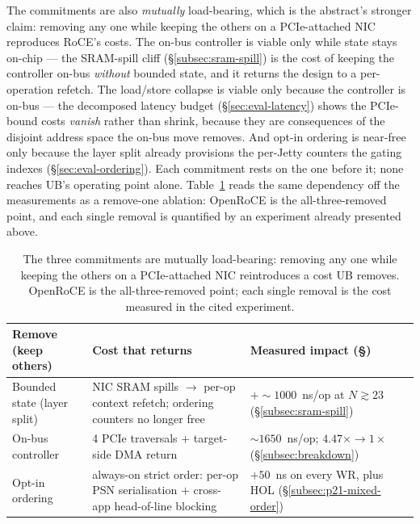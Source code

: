 \documentclass[10pt,twocolumn]{article}
\begin{document}
The commitments are also \emph{mutually} load-bearing, which is the
abstract's stronger claim: removing any one while keeping the others
on a PCIe-attached NIC reproduces RoCE's costs. The on-bus
controller is viable only while state stays on-chip --- the
SRAM-spill cliff (\S\ref{subsec:sram-spill}) is the cost of keeping
the controller on-bus \emph{without} bounded state, and it returns
the design to a per-operation refetch. The load/store collapse is
viable only because the controller is on-bus --- the decomposed
latency budget (\S\ref{sec:eval-latency}) shows the PCIe-bound costs
\emph{vanish} rather than shrink, because they are consequences of
the disjoint address space the on-bus move removes. And opt-in
ordering is near-free only because the layer split already
provisions the per-Jetty counters the gating indexes
(\S\ref{sec:eval-ordering}). Each commitment rests on the one before
it; none reaches UB's operating point alone.
Table~\ref{tab:ablation} reads the same dependency off the
measurements as a remove-one ablation: OpenRoCE is the
all-three-removed point, and each single removal is quantified by an
experiment already presented above.

\begin{table}[h]
  \centering
  \footnotesize
  \setlength{\tabcolsep}{3pt}
  \caption{The three commitments are mutually load-bearing: removing
    any one while keeping the others on a PCIe-attached NIC
    reintroduces a cost UB removes. OpenRoCE is the
    all-three-removed point; each single removal is the cost measured
    in the cited experiment.}
  \label{tab:ablation}
  \begin{tabular}{@{}p{}p{}p{}@{}}
  \toprule
  Remove (keep others) & Cost that returns & Measured impact (\S) \\
  \midrule
  Bounded state (layer split) & NIC SRAM spills $\to$ per-op context refetch; ordering counters no longer free & $+{\sim}1000$~ns/op at $N{\gtrsim}23$ (\S\ref{subsec:sram-spill}) \\
  On-bus controller & 4 PCIe traversals $+$ target-side DMA return & ${\sim}1650$~ns/op; $4.47\times{\to}1\times$ (\S\ref{subsec:breakdown}) \\
  Opt-in ordering & always-on strict order: per-op PSN serialisation $+$ cross-app head-of-line blocking & $+50$~ns on every WR, plus HOL (\S\ref{subsec:p21-mixed-order}) \\
  \bottomrule
  \end{tabular}
\end{table}
\end{document}
